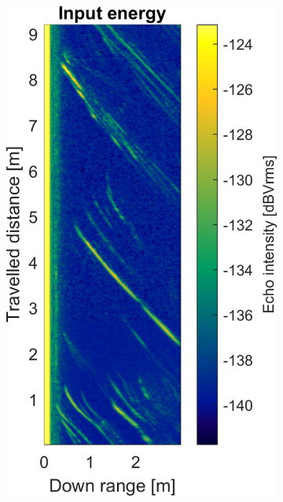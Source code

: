 \begin{figure}[htbp]
    \centering
    \begin{subfigure}[t]{0.475\linewidth}
        \centering
        \includegraphics[width=\linewidth,max height=.475\textheight]{gfx/results/mancave_input.png}
    \end{subfigure}%
    \hfill%
    \begin{subfigure}[t]{0.475\linewidth}
        \centering

\end{subfigure}
\end{figure}
